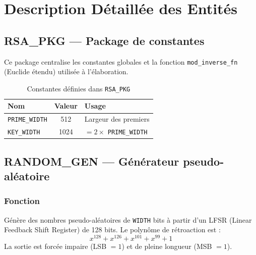 \documentclass[12pt,a4paper]{report}
\begin{document}
\section{Description Détaillée des Entités}
\label{ch:entities}

\subsection{RSA\_PKG --- Package de constantes}
\label{sec:pkg}

Ce package centralise les constantes globales et la fonction
\texttt{mod\_inverse\_fn} (Euclide étendu) utilisée à l'élaboration.

\begin{table}[H]
\centering
\caption{Constantes définies dans \texttt{RSA\_PKG}}
\begin{tabular}{lcl}
\toprule
\textbf{Nom} & \textbf{Valeur} & \textbf{Usage} \\
\midrule
\texttt{PRIME\_WIDTH} & 512  & Largeur des premiers \\
\texttt{KEY\_WIDTH}   & 1024 & $= 2 \times$ \texttt{PRIME\_WIDTH} \\
\bottomrule
\end{tabular}
\end{table}

\subsection{RANDOM\_GEN --- Générateur pseudo-aléatoire}
\label{sec:rng}

\subsubsection{Fonction}
Génère des nombres pseudo-aléatoires de \texttt{WIDTH} bits à partir
d'un LFSR (Linear Feedback Shift Register) de 128 bits. Le polynôme
de rétroaction est :
\[
  x^{128} + x^{126} + x^{101} + x^{99} + 1
\]
La sortie est forcée impaire (LSB $= 1$) et de pleine longueur (MSB $= 1$).
\end{document}
